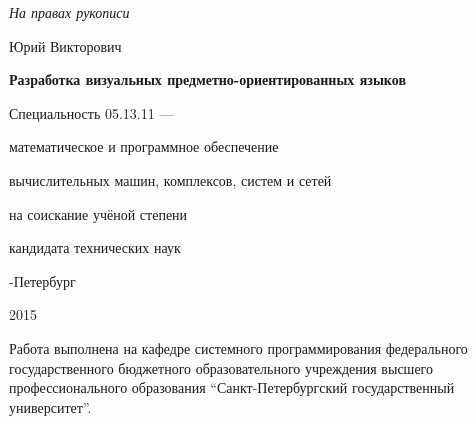 \newcommand{\sfs}{\fontsize{14pt}{15pt}\selectfont}
\sfs %
\thispagestyle{empty}

\vspace{10mm}
\begin{flushright}
  \Large\textit{На правах рукописи}
\end{flushright}

\vspace{25mm}
\begin{center}
{\Large{} Юрий Викторович}
\end{center}

\vspace{20mm}
\begin{center}
{\bf \LARGE Разработка визуальных предметно-ориентированных языков
\par}

\vspace{20mm}
{\Large
Специальность 05.13.11 ---\par
математическое и программное обеспечение\par
вычислительных машин, комплексов, систем и сетей
}

\vspace{15mm}
\par
{} на соискание учёной степени\par
кандидата технических наук
\end{center}

\vspace{35mm}
\begin{center}
{-Петербург\par 2015}
\end{center}

\newpage
\thispagestyle{empty}
\noindent Работа выполнена на кафедре системного программирования федерального государственного
бюджетного образовательного учреждения высшего профессионального образования "`Санкт-Петербургский
государственный университет"'.

